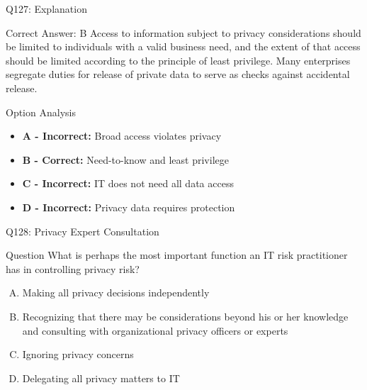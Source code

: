\documentclass{beamer}
\begin{document}
	\begin{frame}{Q127: Explanation}
		\begin{block}{Correct Answer: B}
			Access to information subject to privacy considerations should be limited to individuals with a valid business need, and the extent of that access should be limited according to the principle of least privilege. Many enterprises segregate duties for release of private data to serve as checks against accidental release.
		\end{block}
		\begin{block}{Option Analysis}
			\begin{itemize}
				\item \textbf{A - Incorrect:} Broad access violates privacy
				\item \textbf{B - Correct:} Need-to-know and least privilege
				\item \textbf{C - Incorrect:} IT does not need all data access
				\item \textbf{D - Incorrect:} Privacy data requires protection
			\end{itemize}
		\end{block}
	\end{frame}
	
	\begin{frame}{Q128: Privacy Expert Consultation}
		\begin{block}{Question}
			What is perhaps the most important function an IT risk practitioner has in controlling privacy risk?
		\end{block}
		\begin{enumerate}[(A)]
			\item Making all privacy decisions independently
			\item Recognizing that there may be considerations beyond his or her knowledge and consulting with organizational privacy officers or experts
			\item Ignoring privacy concerns
			\item Delegating all privacy matters to IT
		\end{enumerate}
	\end{frame}
	
\end{document}

